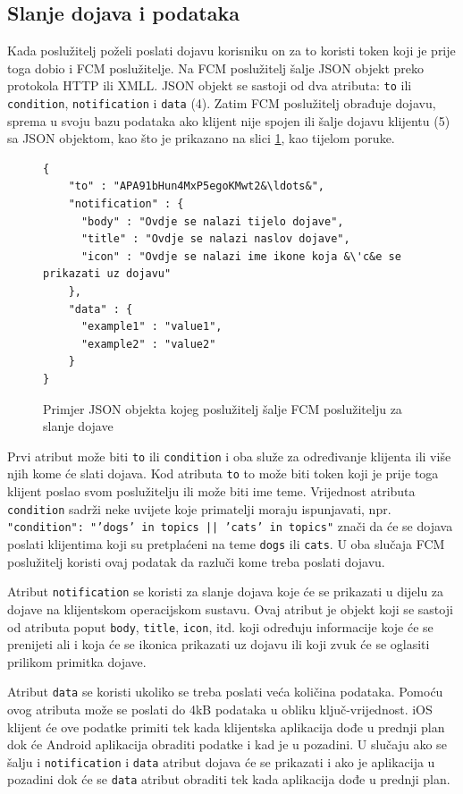 \documentclass[times, utf8, zavrsni]{fer}
\begin{document}
\subsection{Slanje dojava i podataka}
Kada poslužitelj poželi poslati dojavu korisniku on za to koristi token koji je prije toga dobio i FCM poslužitelje. Na FCM poslužitelj šalje JSON objekt preko protokola HTTP ili XMLL. JSON objekt se sastoji od dva atributa: {\tt to}  ili {\tt condition}, {\tt notification} i {\tt data} (4). Zatim FCM poslužitelj obrađuje dojavu, sprema u svoju bazu podataka ako klijent nije spojen ili šalje dojavu klijentu (5) sa JSON objektom, kao što je prikazano na slici \ref{lst:json-dojava}, kao tijelom poruke.

\begin{figure}
\begin{lstlisting}
{
    "to" : "APA91bHun4MxP5egoKMwt2&\ldots&",
    "notification" : {
      "body" : "Ovdje se nalazi tijelo dojave",
      "title" : "Ovdje se nalazi naslov dojave",
      "icon" : "Ovdje se nalazi ime ikone koja &\'c&e se prikazati uz dojavu"
    },
    "data" : {
      "example1" : "value1",
      "example2" : "value2"
    }
}
\end{lstlisting}
\caption{Primjer JSON objekta kojeg poslužitelj šalje FCM poslužitelju za slanje dojave}
\label{lst:json-dojava}
\end{figure}

Prvi atribut može biti {\tt to} ili {\tt condition} i oba služe za određivanje klijenta ili više njih kome će slati dojava. Kod atributa {\tt to} to može biti token koji je prije toga klijent poslao svom poslužitelju ili može biti ime teme. Vrijednost atributa {\tt condition} sadrži neke uvijete koje primatelji moraju ispunjavati, npr. {\tt "condition": "'dogs' in topics || 'cats' in topics"} znači da će se dojava poslati klijentima koji su pretplaćeni na teme {\tt dogs}  ili {\tt cats}. U oba slučaja FCM poslužitelj koristi ovaj podatak da razluči kome treba poslati dojavu.

Atribut {\tt notification} se koristi za slanje dojava koje će se prikazati u dijelu za dojave na klijentskom operacijskom sustavu. Ovaj atribut je objekt koji se sastoji od atributa poput {\tt body}, {\tt title}, {\tt icon}, itd. koji određuju informacije koje će se prenijeti ali i koja će se ikonica prikazati uz dojavu ili koji zvuk će se oglasiti prilikom primitka dojave.

Atribut {\tt data} se koristi ukoliko se treba poslati veća količina podataka. Pomoću ovog atributa može se poslati do 4kB podataka u obliku ključ-vrijednost. iOS klijent će ove podatke primiti tek kada klijentska aplikacija dođe u prednji plan dok će Android aplikacija obraditi podatke i kad je u pozadini. U slučaju ako se šalju i {\tt notification} i {\tt data} atribut dojava će se prikazati i ako je aplikacija u pozadini dok će se {\tt data} atribut obraditi tek kada aplikacija dođe u prednji plan.\citep{fcm2017}
\end{document}

